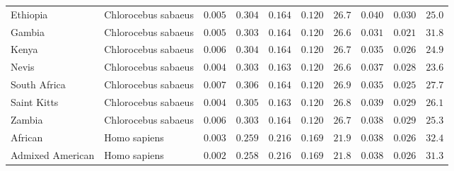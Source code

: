 \documentclass{article}
\begin{document}
\begin{center}
\begin{longtable*}{|l|l|r|r|r|r|r|r|r|r|}
            Ethiopia & Chlorocebus sabaeus &               $ 0.005$ &                $ 0.304$ &        $ 0.164$ &              $ 0.120$ &           $  26.7$ &                   $ 0.040$ &                         $ 0.030$ &                      $  25.0$ \\
            Gambia & Chlorocebus sabaeus &               $ 0.005$ &                $ 0.303$ &        $ 0.164$ &              $ 0.120$ &           $  26.6$ &                   $ 0.031$ &                         $ 0.021$ &                      $  31.8$ \\
            Kenya & Chlorocebus sabaeus &               $ 0.006$ &                $ 0.304$ &        $ 0.164$ &              $ 0.120$ &           $  26.7$ &                   $ 0.035$ &                         $ 0.026$ &                      $  24.9$ \\
            Nevis & Chlorocebus sabaeus &               $ 0.004$ &                $ 0.303$ &        $ 0.163$ &              $ 0.120$ &           $  26.6$ &                   $ 0.037$ &                         $ 0.028$ &                      $  23.6$ \\
            South Africa & Chlorocebus sabaeus &               $ 0.007$ &                $ 0.306$ &        $ 0.164$ &              $ 0.120$ &           $  26.9$ &                   $ 0.035$ &                         $ 0.025$ &                      $  27.7$ \\
            Saint Kitts & Chlorocebus sabaeus &               $ 0.004$ &                $ 0.305$ &        $ 0.163$ &              $ 0.120$ &           $  26.8$ &                   $ 0.039$ &                         $ 0.029$ &                      $  26.1$ \\
            Zambia & Chlorocebus sabaeus &               $ 0.006$ &                $ 0.303$ &        $ 0.164$ &              $ 0.120$ &           $  26.7$ &                   $ 0.038$ &                         $ 0.029$ &                      $  25.3$ \\
            African &        Homo sapiens &               $ 0.003$ &                $ 0.259$ &        $ 0.216$ &              $ 0.169$ &           $  21.9$ &                   $ 0.038$ &                         $ 0.026$ &                      $  32.4$ \\
            Admixed American &        Homo sapiens &               $ 0.002$ &                $ 0.258$ &        $ 0.216$ &              $ 0.169$ &           $  21.8$ &                   $ 0.038$ &                         $ 0.026$ &                      $  31.3$ \\

\end{longtable*}
\end{center}
\end{document}
